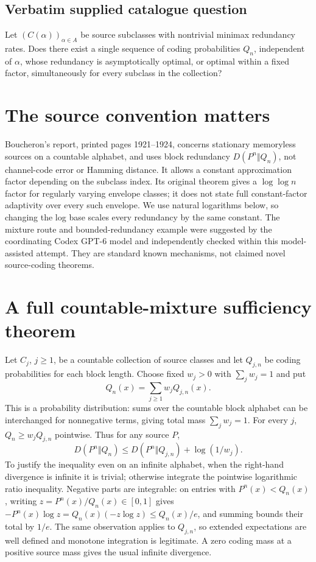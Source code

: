 \documentclass[11pt]{article}
\begin{document}
\subsection{Verbatim supplied catalogue question}
Let $(C(\alpha))_{\alpha\in A}$ be source subclasses with nontrivial minimax redundancy rates. Does there exist a single sequence of coding probabilities $Q_n$, independent of $\alpha$, whose redundancy is asymptotically optimal, or optimal within a fixed factor, simultaneously for every subclass in the collection?

\section{The source convention matters}
Boucheron's report, printed pages 1921--1924, concerns stationary
memoryless sources on a countable alphabet, and uses block redundancy
$D(P^n\Vert Q_n)$, not channel-code error or Hamming distance.
It allows a constant approximation factor depending on the subclass
index. Its original theorem gives a $\log\log n$ factor for regularly
varying envelope classes; it does not state full constant-factor
adaptivity over every such envelope. We use natural logarithms below,
so changing the log base scales every redundancy by the same constant.
The mixture route and bounded-redundancy example were suggested by
the coordinating Codex GPT-6 model and independently checked within
this model-assisted attempt. They are standard known mechanisms,
not claimed novel source-coding theorems.

\section{A full countable-mixture sufficiency theorem}
Let $C_j$, $j\ge1$, be a countable collection of source classes and
let $Q_{j,n}$ be coding probabilities for each block length. Choose
fixed $w_j>0$ with $\sum_jw_j=1$ and put
\[
Q_n(x)=\sum_{j\ge1}w_jQ_{j,n}(x).
\]
This is a probability distribution: sums over the countable block
alphabet can be interchanged for nonnegative terms, giving total mass
$\sum_jw_j=1$. For every $j$, $Q_n\ge w_jQ_{j,n}$ pointwise.
Thus for any source $P$,
\[
D(P^n\Vert Q_n)\le D(P^n\Vert Q_{j,n})+\log(1/w_j).
\]
To justify the inequality even on an infinite alphabet, when the
right-hand divergence is infinite it is trivial; otherwise integrate
the pointwise logarithmic ratio inequality. Negative parts are
integrable: on entries with $P^n(x)<Q_n(x)$, writing
$z=P^n(x)/Q_n(x)\in[0,1]$ gives
$-P^n(x)\log z=Q_n(x)(-z\log z)\le Q_n(x)/e$,
and summing bounds their total by $1/e$. The same observation applies
to $Q_{j,n}$, so extended expectations are well defined and monotone
integration is legitimate. A zero coding mass at a positive source
mass gives the usual infinite divergence.
\end{document}
